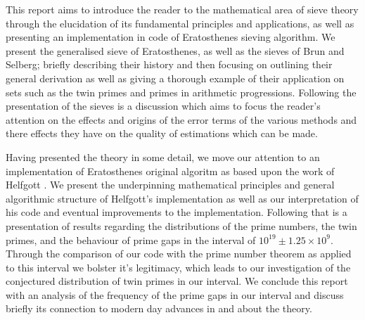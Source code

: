 This report aims to introduce the reader to the mathematical area of sieve theory through the elucidation of its fundamental principles and applications, as well as presenting an implementation in code of Eratosthenes sieving algorithm. 
We present the generalised sieve of Eratosthenes, as well as the sieves of Brun and Selberg; briefly describing their history and then focusing on outlining their general derivation as well as giving a thorough example of their application on sets such as the twin primes and primes in arithmetic progressions. 
Following the presentation of the sieves is a discussion which aims to focus the reader's attention on the effects and origins of the error terms of the various methods and there effects they have on the quality of estimations which can be made.

Having presented the theory in some detail, we move our attention to an implementation of Eratosthenes original algoritm as based upon the work of Helfgott \cite{HaraldSieve}.
We present the underpinning mathematical principles and general algorithmic structure of Helfgott's implementation as well as our interpretation of his code and eventual improvements to the implementation.
Following that is a presentation of results regarding the distributions of the prime numbers, the twin primes, and the behaviour of prime gaps in the interval of \(10^{19}\pm 1.25\times10^9\).
Through the comparison of our code with the prime number theorem as applied to this interval we bolster it's legitimacy, which leads to our investigation of the conjectured distribution of twin primes in our interval.
We conclude this report with an analysis of the frequency of the prime gaps in our interval and discuss briefly its connection to modern day advances in and about the theory.